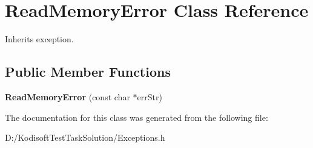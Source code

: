 \hypertarget{class_read_memory_error}{\section{Read\+Memory\+Error Class Reference}
\label{class_read_memory_error}
}


Inherits exception.

\subsection*{Public Member Functions}
\begin{DoxyCompactItemize}
\item 
\hypertarget{class_read_memory_error_abe64d2fdb58110042bbae74232d70c05}{{\bfseries Read\+Memory\+Error} (const char $\ast$err\+Str)}\label{class_read_memory_error_abe64d2fdb58110042bbae74232d70c05}

\end{DoxyCompactItemize}


The documentation for this class was generated from the following file\+:\begin{DoxyCompactItemize}
\item 
D\+:/\+Kodisoft\+Test\+Task\+Solution/Exceptions.\+h\end{DoxyCompactItemize}
